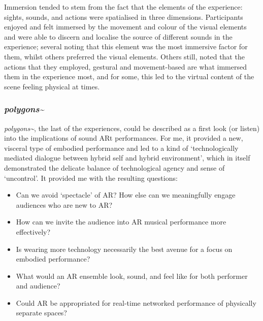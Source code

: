 Immersion tended to stem from the fact that the elements of the experience: sights, sounds, and actions were spatialised in three dimensions. Participants enjoyed and felt immersed by the movement and colour of the visual elements and were able to discern and localise the source of different sounds in the experience; several noting that this element was the most immersive factor for them, whilst others preferred the visual elements. Others still, noted that the actions that they employed, gestural and movement-based are what immersed them in the experience most, and for some, this led to the virtual content of the scene feeling physical at times.

\subsubsection{\textit{polygons\textasciitilde{}}}
\textit{polygons\textasciitilde{}}, the last of the experiences, could be described as a first look (or listen) into the implications of sound ARt performances. For me, it provided a new, visceral type of embodied performance and led to a kind of `technologically mediated dialogue between hybrid self and hybrid environment', which in itself demonstrated the delicate balance of technological agency and sense of `uncontrol'. It provided me with the resulting questions: 
\begin{itemize}
    \item Can we avoid `spectacle' of AR? How else can we meaningfully engage audiences who are new to AR?
    \item How can we invite the audience into AR musical performance more effectively?
    \item Is wearing more technology necessarily the best avenue for a focus on embodied performance?
    \item What would an AR ensemble look, sound, and feel like for both performer and audience?
    \item Could AR be appropriated for real-time networked performance of physically separate spaces?
\end{itemize}





